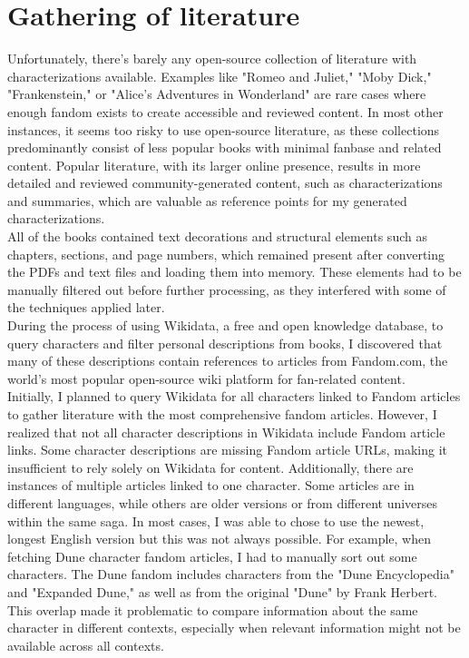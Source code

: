 
\chapter{Gathering of literature}
Unfortunately, there's barely any open-source collection of literature with 
characterizations available. Examples like "Romeo and Juliet," "Moby Dick," "Frankenstein," or "Alice's Adventures in Wonderland" are rare cases where enough fandom exists to create accessible and reviewed content. In most other instances, it seems too risky to use open-source literature, as these collections predominantly consist of less popular books with minimal fanbase and related content. Popular literature, with its larger online presence, results in more detailed and reviewed community-generated content, such as characterizations and summaries, which are valuable as reference points for my generated characterizations.\\

All of the books contained text decorations and structural elements such as chapters, sections, and page numbers, which remained present after converting the PDFs and text files and loading them into memory. These elements had to be manually filtered out before further processing, as they interfered with some of the techniques applied later.\\

During the process of using Wikidata, a free and open knowledge database, to query characters and filter personal descriptions from books, I discovered that many of these descriptions contain references to articles from Fandom.com, the world's most popular open-source wiki platform for fan-related content.\\

Initially, I planned to query Wikidata for all characters linked to Fandom articles to gather literature with the most comprehensive fandom articles. However, I realized that not all character descriptions in Wikidata include Fandom article links. Some character descriptions are missing Fandom article URLs, making it insufficient to rely solely on Wikidata for content. Additionally, there are instances of multiple articles linked to one character. Some articles are in different languages, while others are older versions or from different universes within the same saga. In most cases, I was able to chose to use the newest, longest English version but this was not always possible. For example, when fetching Dune character fandom articles, I had to manually sort out some characters. The Dune fandom includes characters from the "Dune Encyclopedia" and "Expanded Dune," as well as from the original "Dune" by Frank Herbert. This overlap made it problematic to compare information about the same character in different contexts, especially when relevant information might not be available across all contexts.\\



